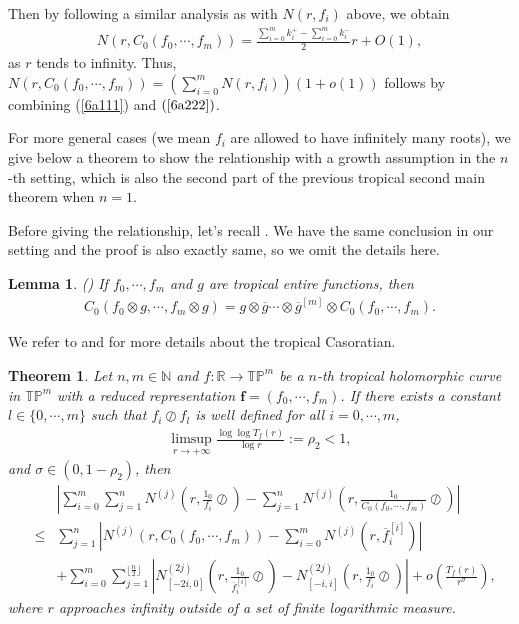 \documentclass{article}
\newtheorem{theorem}[defin]{Theorem}
\newtheorem{lemma}[defin]{Lemma}
\begin{document}
Then by following a similar analysis as with $N(r, f_{i})$ above, we obtain
\begin{eqnarray}\label{6a222}
    N(r, C_{0}(f_{0}, \cdots, f_{m}))=\frac{\sum_{i=0}^{m}k_{i}^{+}-\sum_{i=0}^{m}k_{i}^{-}}{2}r+O(1),
\end{eqnarray}
as $r$ tends to infinity. Thus, $N(r, C_{0}(f_{0}, \cdots, f_{m}))=(\sum_{i=0}^{m}N(r, f_{i}))(1+o(1))$ follows by combining (\ref{6a111}) and $(\ref{6a222})$.

For more general cases (we mean $f_{i}$ are allowed to have infinitely many roots), we give below a theorem to show the relationship with a growth assumption in the $n$-th setting, which is also the second part of the previous tropical second main theorem when $n=1$.

Before giving the relationship, let's recall \cite[Lemma 5.1]{Pro}. We have the same conclusion in our setting and the proof is also exactly same, so we omit the details here.
\begin{lemma}
    (\cite[Lemma 5.1]{Pro}) If $f_{0}, \cdots, f_{m}$ and $g$ are tropical entire functions, then
    \begin{eqnarray*}
        C_{0}(f_{0}\otimes g, \cdots, f_{m}\otimes g)=g\otimes \overline{g}\cdots\otimes \overline{g}^{[m]}\otimes C_{0}(f_{0}, \cdots, f_{m}).
    \end{eqnarray*}
\end{lemma}
We refer to \cite{Rbook} and \cite{Pro} for more details about the tropical Casoratian.

\begin{theorem}\label{theorem6.2}
    Let $n, m\in\mathbb{N}$ and $f:\mathbb{R}\rightarrow \mathbb{T}\mathbb{P}^{m}$ be a $n$-th tropical holomorphic curve in $\mathbb{T}\mathbb{P}^{m}$ with a reduced representation $\textbf{f}=(f_{0}, \cdots, f_{m})$. If there exists a constant $l\in\{0, \cdots, m\}$ such that $f_{i}\oslash f_{l}$ is well defined for all $i=0, \cdots, m$,
    \begin{eqnarray}\label{6f1}
        \limsup\limits_{r\rightarrow +\infty}\frac{\log\log T_{f}(r)}{\log r}:=\rho_{2}<1,
    \end{eqnarray}
    and $\sigma\in(0, 1-\rho_{2})$, then
    \begin{eqnarray}\label{6f2}
        &&\left|\sum_{i=0}^{m}\sum_{j=1}^{n}N^{(j)}\left(r, \frac{1_{0}}{f_{i}}\oslash\right)-\sum_{j=1}^{n}N^{(j)}\left(r, \frac{1_{0}}{C_{0}(f_{0}, \cdots, f_{m})}\oslash\right)\right|\nonumber\\
        &\leq&\sum_{j=1}^{n}\left|N^{(j)}(r, C_{0}(f_{0}, \cdots, f_{m}))-\sum_{i=0}^{m}N^{(j)}(r, \overline{f}_{i}^{[i]})\right|\nonumber\\
        &&+\sum_{i=0}^{m}\sum_{j=1}^{\lfloor \frac{n}{2}\rfloor}\left|N_{[-2i, 0]}^{(2j)}\left(r, \frac{1_{0}}{\overline{f}_{i}^{[i]}}\oslash\right)-N_{[-i, i]}^{(2j)}\left(r, \frac{1_{0}}{f_{i}}\oslash\right)\right|+o\left(\frac{T_{f}(r)}{r^{\sigma}}\right),
    \end{eqnarray}
    where $r$ approaches infinity outside of a set of finite logarithmic measure.
\end{theorem}
\end{document}
